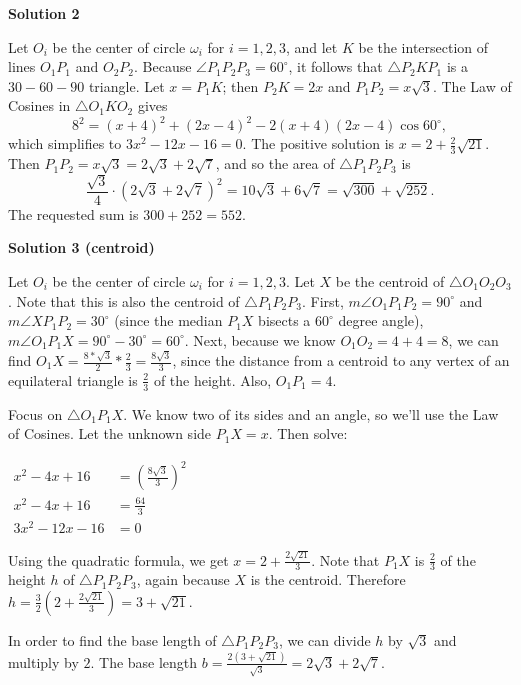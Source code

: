 \begin{enumerate}
\textbf{Solution 2}

Let $O_i$ be the center of circle $\omega_i$ for $i=1,2,3$, and let $K$ be the intersection of lines $O_1P_1$ and $O_2P_2$. Because $\angle P_1P_2P_3 = 60^\circ$, it follows that $\triangle P_2KP_1$ is a $30-60-90$ triangle. Let $x=P_1K$; then $P_2K = 2x$ and $P_1P_2 = x \sqrt 3$. The Law of Cosines in $\triangle O_1KO_2$ gives 
 \[8^2 = (x+4)^2 + (2x-4)^2 - 2(x+4)(2x-4)\cos 60^\circ,\]which simplifies to $3x^2 - 12x - 16 = 0$. The positive solution is $x = 2 + \frac23\sqrt{21}$. Then $P_1P_2 = x\sqrt 3 = 2\sqrt 3 + 2\sqrt 7$, and so the area of $\triangle P_1P_2P_3$ is 
 \[\frac{\sqrt 3}4\cdot\left(2\sqrt 3 + 2\sqrt 7\right)^2 = 10\sqrt 3 + 6\sqrt 7 = \sqrt{300} + \sqrt{252}.\]The requested sum is $300 + 252 = \boxed{552}$.

 



\textbf{Solution 3 (centroid)}

Let $O_i$ be the center of circle $\omega_i$ for $i=1,2,3$. Let $X$ be the centroid of $\triangle{O_1O_2O_3}$. Note that this is also the centroid of $\triangle{P_1P_2P_3}$. First, $m\angle{O_1P_1P_2} = 90^\circ$ and $m\angle{XP_1P_2} = 30^\circ$ (since the median $P_1X$ bisects a $60^\circ$ degree angle), $m\angle{O_1P_1X} = 90^\circ - 30^\circ = 60^\circ$. Next, because we know $O_1O_2 = 4 + 4 = 8$, we can find $O_1X = \frac{8*\sqrt{3}}{2} * \frac{2}{3} = \frac{8\sqrt{3}}{3}$, since the distance from a centroid to any vertex of an equilateral triangle is $\frac{2}{3}$ of the height. Also, $O_1P_1 = 4$. 

 Focus on $\triangle{O_1P_1X}$. We know two of its sides and an angle, so we'll use the Law of Cosines. Let the unknown side $P_1X = x$. Then solve:

 $\begin{aligned} x^2-4x+16 &=\left(\frac{8\sqrt3}{3}\right)^2\\ x^2-4x+16 &=\frac{64}{3}\\ 3x^2-12x-16 &=0 \end{aligned}$

 

 Using the quadratic formula, we get $x = 2 + \frac{2\sqrt{21}}{3}$. Note that $P_1X$ is $\frac{2}{3}$ of the height $h$ of $\triangle{P_1P_2P_3}$, again because $X$ is the centroid. Therefore $h = \frac{3}{2}(2 + \frac{2\sqrt{21}}{3}) = 3 + \sqrt{21}.$ 

 In order to find the base length of $\triangle{P_1P_2P_3}$, we can divide $h$ by $\sqrt{3}$ and multiply by $2$. The base length $b = \frac{2(3 + \sqrt{21})}{\sqrt{3}} = 2\sqrt3 + 2\sqrt7$. 


\end{enumerate}
